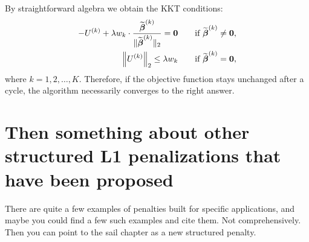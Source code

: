 By straightforward algebra  we obtain the KKT conditions:
\begin{align*}
-U^{(k)}+\lambda w_{k}\cdot\frac {\widetilde{\boldsymbol{\beta}}^{(k)} }{\Vert\widetilde{\boldsymbol{\beta}}^{(k)}\Vert_2}=\boldsymbol{0}\qquad\textrm{if }\widetilde{\boldsymbol{\beta}}^{(k)}\neq \boldsymbol{0},\\
\left\Vert
U^{(k)}
\right\Vert_2 \le\lambda w_{k}\qquad\textrm{if }\widetilde{\boldsymbol{\beta}}^{(k)}=\boldsymbol{0},
\end{align*}
where $k=1,2,\ldots,K$. Therefore, if the objective function stays unchanged after a cycle, the algorithm necessarily converges to the right
answer.




\section{Then something about other structured L1 penalizations that have been proposed}



There are quite a few examples of penalties built for specific applications, and maybe you could find a few such examples and cite them. Not comprehensively.  Then you can point to the sail chapter as a new structured penalty.

